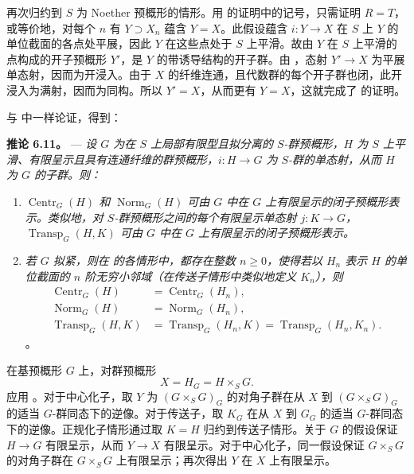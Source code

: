 再次归约到 \(S\) 为 Noether 预概形的情形。用  的证明中的记号，只需证明 \(R=T\)，或等价地，对每个 \(n\) 有 \(Y\supset X_n\) 蕴含 \(Y=X\)。此假设蕴含 \(i:Y\to X\) 在 \(S\) 上 \(Y\) 的单位截面的各点处平展，因此 \(Y\) 在这些点处于 \(S\) 上平滑。故由 \(Y\) 在 \(S\) 上平滑的点构成的开子预概形 \(Y'\)，是 \(Y\) 的带诱导结构的开子群。由 ，态射 \(Y'\to X\) 为平展单态射，因而为开浸入。由于 \(X\) 的纤维连通，且代数群的每个开子群也闭，此开浸入为满射，因而为同构。所以 \(Y'=X\)，从而更有 \(Y=X\)，这就完成了  的证明。

与  中一样论证，得到：

\medskip\noindent{}\textbf{推论 6.11。} --- \textit{设 \(G\) 为在 \(S\) 上局部有限型且拟分离的 \(S\)-群预概形，\(H\) 为 \(S\) 上平滑、有限呈示且具有连通纤维的群预概形，\(i:H\to G\) 为 \(S\)-群的单态射，从而 \(H\) 为 \(G\) 的子群。则：}

\begin{enumerate}\item[(a)]\textit{\(\operatorname{Centr}_G(H)\) 和 \(\operatorname{Norm}_G(H)\) 可由 \(G\) 中在 \(G\) 上有限呈示的闭子预概形表示。类似地，对 \(S\)-群预概形之间的每个有限呈示单态射 \(j:K\to G\)，\(\operatorname{Transp}_G(H,K)\) 可由 \(G\) 中在 \(G\) 上有限呈示的闭子预概形表示。}

\item[(b)]\textit{若 \(G\) 拟紧，则在  的各情形中，都存在整数 \(n\geq0\)，使得若以 \(H_n\) 表示 \(H\) 的单位截面的 \(n\) 阶无穷小邻域（在传送子情形中类似地定义 \(K_n\)），则}  \[
  \begin{aligned}
  \operatorname{Centr}_G(H)
    &=\operatorname{Centr}_G(H_n),\\
  \operatorname{Norm}_G(H)
    &=\operatorname{Norm}_G(H_n),\\
  \operatorname{Transp}_G(H,K)
    &=\operatorname{Transp}_G(H_n,K)
     =\operatorname{Transp}_G(H_n,K_n).
  \end{aligned}
\]。\end{enumerate}

在基预概形 \(G\) 上，对群预概形  \[
  X=H_G=H\times_SG.
\] 应用 。对于中心化子，取 \(Y\) 为 \((G\times_SG)_G\) 的对角子群在从 \(X\) 到 \((G\times_SG)_G\) 的适当 \(G\)-群同态下的逆像。对于传送子，取 \(K_G\) 在从 \(X\) 到 \(G_G\) 的适当 \(G\)-群同态下的逆像。正规化子情形通过取 \(K=H\) 归约到传送子情形。关于 \(G\) 的假设保证 \(H\to G\) 有限呈示，从而 \(Y\to X\) 有限呈示。对于中心化子，同一假设保证 \(G\times_SG\) 的对角子群在 \(G\times_SG\) 上有限呈示；再次得出 \(Y\) 在 \(X\) 上有限呈示。

